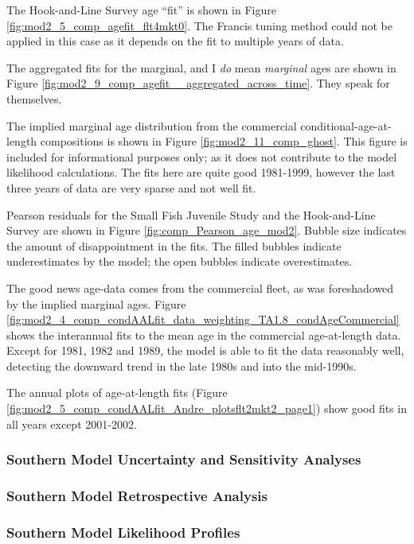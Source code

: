 \documentclass[12pt,]{article}
\begin{document}
The Hook-and-Line Survey age ``fit'' is shown in Figure
\ref{fig:mod2_5_comp_agefit_flt4mkt0}. The Francis tuning method could
not be applied in this case as it depends on the fit to multiple years
of data.

The aggregated fits for the marginal, and I \emph{do} mean
\emph{marginal} ages are shown in Figure
\ref{fig:mod2_9_comp_agefit__aggregated_across_time}. They speak for
themselves.

The implied marginal age distribution from the commercial
conditional-age-at-length compositions is shown in Figure
\ref{fig:mod2_11_comp_ghost}. This figure is included for informational
purposes only; as it does not contribute to the model likelihood
calculations. The fits here are quite good 1981-1999, however the last
three years of data are very sparse and not well fit.

Pearson residuals for the Small Fish Juvenile Study and the
Hook-and-Line Survey are shown in Figure
\ref{fig:comp_Pearson_age_mod2}. Bubble size indicates the amount of
disappointment in the fits. The filled bubbles indicate underestimates
by the model; the open bubbles indicate overestimates.

The good news age-data comes from the commercial fleet, as was
foreshadowed by the implied marginal ages. Figure
\ref{fig:mod2_4_comp_condAALfit_data_weighting_TA1.8_condAgeCommercial}
shows the interannual fits to the mean age in the commercial
age-at-length data. Except for 1981, 1982 and 1989, the model is able to
fit the data reasonably well, detecting the downward trend in the late
1980s and into the mid-1990s.

The annual plots of age-at-length fits (Figure
\ref{fig:mod2_5_comp_condAALfit_Andre_plotsflt2mkt2_page1}) show good
fits in all years except 2001-2002.

\subsubsection{Southern Model Uncertainty and Sensitivity
Analyses}\label{southern-model-uncertainty-and-sensitivity-analyses}

\subsubsection{Southern Model Retrospective
Analysis}\label{southern-model-retrospective-analysis}

\subsubsection{Southern Model Likelihood
Profiles}\label{southern-model-likelihood-profiles}
\end{document}
